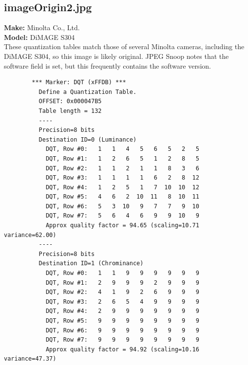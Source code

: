 \documentclass{article}
\begin{document}
\subsection{imageOrigin2.jpg}
	\textbf{Make:} Minolta Co., Ltd.\\
	\textbf{Model:} DiMAGE S304\\
These quantization tables match those of several Minolta cameras,
including the DiMAGE S304, so this image is likely original.
JPEG Snoop notes that the software field is set, but this
frequently contains the software version.
\begin{lstlisting}
		*** Marker: DQT (xFFDB) ***
		  Define a Quantization Table.
		  OFFSET: 0x000047B5
		  Table length = 132
		  ----
		  Precision=8 bits
		  Destination ID=0 (Luminance)
			DQT, Row #0:   1   1   4   5   6   5   2   5 
			DQT, Row #1:   1   2   6   5   1   2   8   5 
			DQT, Row #2:   1   1   2   1   1   8   3   6 
			DQT, Row #3:   1   1   1   1   6   2   8  12 
			DQT, Row #4:   1   2   5   1   7  10  10  12 
			DQT, Row #5:   4   6   2  10  11   8  10  11 
			DQT, Row #6:   5   3  10   9   7   7   9  10 
			DQT, Row #7:   5   6   4   6   9   9  10   9 
			Approx quality factor = 94.65 (scaling=10.71 variance=62.00)
		  ----
		  Precision=8 bits
		  Destination ID=1 (Chrominance)
			DQT, Row #0:   1   1   9   9   9   9   9   9 
			DQT, Row #1:   2   9   9   9   2   9   9   9 
			DQT, Row #2:   4   1   9   2   6   9   9   9 
			DQT, Row #3:   2   6   5   4   9   9   9   9 
			DQT, Row #4:   2   9   9   9   9   9   9   9 
			DQT, Row #5:   9   9   9   9   9   9   9   9 
			DQT, Row #6:   9   9   9   9   9   9   9   9 
			DQT, Row #7:   9   9   9   9   9   9   9   9 
			Approx quality factor = 94.92 (scaling=10.16 variance=47.37)
\end{lstlisting}
\end{document}
